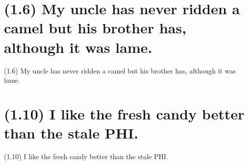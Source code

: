 \documentclass{article}
\begin{document}
\section*{(1.6) My uncle has never ridden a camel but his brother has, although it was lame.}

\bigbreak
\begin{enumerate*}
\item[(1.6)] My uncle has never ridden a camel but his brother has, although it was lame.
\end{enumerate*}
\bigbreak

\bigbreak
\begin{minipage}{\textwidth}
\end{minipage}
\bigbreak

\clearpage

%
%

\section*{(1.10) I like the fresh candy better than the stale PHI.}

\bigbreak
\begin{enumerate*}
\item[(1.10)] I like the fresh candy better than the stale PHI.
\end{enumerate*}
\bigbreak

\bigbreak
\begin{minipage}{\textwidth}
\end{minipage}
\bigbreak
\end{document}
